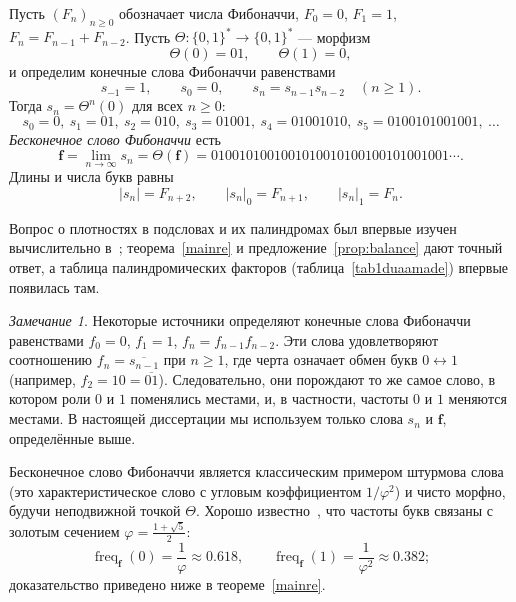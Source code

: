 \documentclass[a4paper,14pt]{extreport}
\theoremstyle{plain}
\theoremstyle{definition}
\theoremstyle{remark}
\newtheorem{remark}{Замечание}
\begin{document}
Пусть $(F_n)_{n\ge0}$ обозначает числа Фибоначчи, $F_0=0$, $F_1=1$, $F_{n}=F_{n-1}+F_{n-2}$.
Пусть $\Theta\colon\{0,1\}^*\to\{0,1\}^*$ --- морфизм
\begin{equation}
	\Theta(0)=01,\qquad \Theta(1)=0 ,
\end{equation}
и определим конечные слова Фибоначчи равенствами
\begin{equation}
	s_{-1}=1,\qquad s_0=0,\qquad s_n=s_{n-1}s_{n-2}\quad(n\ge1).
\end{equation}
Тогда $s_n=\Theta^n(0)$ для всех $n\ge0$:
\begin{equation}
	s_0=0,\ s_1=01,\ s_2=010,\ s_3=01001,\ s_4=01001010,\ s_5=0100101001001,\ \dots
\end{equation}
\emph{Бесконечное слово Фибоначчи} есть
\begin{equation}\label{re.1}
	\mathbf{f}=\lim_{n\to\infty}s_n=\Theta(\mathbf f)
	=0100101001001010010100100101001001\cdots .
\end{equation}
Длины и числа букв равны
\begin{equation}
	|s_n|=F_{n+2},\qquad |s_n|_0=F_{n+1},\qquad |s_n|_1=F_n .
\end{equation}

Вопрос о плотностях в подсловах и их палиндромах был впервые изучен вычислительно в~\cite{Abdullah}; теорема~\ref{mainre} и предложение~\ref{prop:balance} дают точный ответ, а таблица палиндромических факторов (таблица~\ref{tab1duaamade}) впервые появилась там.

\begin{remark}
	Некоторые источники определяют конечные слова Фибоначчи равенствами $f_0=0$, $f_1=1$, $f_n=f_{n-1}f_{n-2}$.
	Эти слова удовлетворяют соотношению $f_n=\overline{s_{n-1}}$ при $n\ge1$, где черта означает обмен букв
	$0\leftrightarrow1$ (например, $f_2=10=\overline{01}$). Следовательно, они порождают то же самое слово, в котором
	роли $0$ и $1$ поменялись местами, и, в частности, частоты $0$ и $1$
	меняются местами. В настоящей диссертации мы используем только слова $s_n$ и $\mathbf f$, определённые выше.
\end{remark}

Бесконечное слово Фибоначчи является классическим примером штурмова слова (это характеристическое
слово с угловым коэффициентом $1/\varphi^{2}$) и чисто морфно, будучи неподвижной точкой $\Theta$.
Хорошо известно~\cite{Berstel}, что частоты букв связаны с золотым
сечением $\varphi=\frac{1+\sqrt5}{2}$:
\begin{equation}
	\operatorname{freq}_{\mathbf f}(0)=\frac1\varphi\approx0.618,\qquad
	\operatorname{freq}_{\mathbf f}(1)=\frac1{\varphi^{2}}\approx0.382 ;
\end{equation}
доказательство приведено ниже в теореме~\ref{mainre}.
\end{document}
